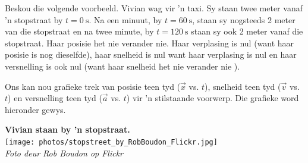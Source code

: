 \begin{minipage}{.5\textwidth}
Beskou die volgende voorbeeld. Vivian wag vir  'n taxi. Sy staan twee meter vanaf  'n stopstraat by $t=0~\text{s}$. Na een minuut, by $t=60~\text{s}$, staan sy nogsteeds 2 meter van die stopstraat en na twee minute, by $t=120~\text{s}$ staan sy ook  2 meter vanaf die stopstraat. Haar posisie het nie verander nie. Haar verplasing is nul (want haar posisie is nog dieselfde), haar snelheid is nul want haar verplasing is nul en haar versnelling is ook nul (want haar snelheid het nie verander nie ).

Ons kan nou grafieke trek van posisie teen tyd ($\vec{x}$ vs. $t$), snelheid teen tyd ($\vec{v}$ vs. $t$) en versnelling teen tyd ($\vec{a}$ vs. $t$) vir  'n stilstaande voorwerp. Die grafieke word hieronder gewys.
\end{minipage}
\begin{minipage}{.5\textwidth}
\begin{center}
 \textbf{Vivian staan by  'n stopstraat.}\\
\texttt{[image: photos/stopstreet\_by\_RobBoudon\_Flickr.jpg]}\\
\textit{Foto deur Rob Boudon op Flickr}
\end{center}
\end{minipage}



